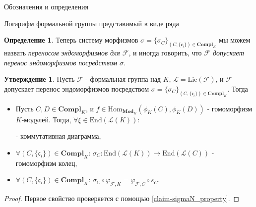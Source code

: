 \documentclass[a4paper,14pt]{extarticle}
\theoremstyle{definition}
\newtheorem{definition}{Определение}[section]
\newtheorem{claim}[theorem]{Утверждение}
\newcommand{\End}[1]{\mathrm{End}\left(#1\right)}
\newcommand{\Compl}[1]{\mathbf{Compl}_{#1}}
\newcommand{\forget}[1]{\phi_{#1}}
\newcommand{\Lie}[1]{\mathrm{Lie}\left(#1\right)}
\newcommand{\Mod}[1]{\mathbf{Mod}_{#1}}
\newcommand{\fc}{\mathfrak{c}}
\newcommand{\sF}{\mathscr{F}}
\newcommand{\sL}{\mathscr{L}}
\begin{document}
\begin{section}{Обозначения и определения}
\begin{subsection}{Логарифм формальной группы представимый в виде ряда}
\begin{definition}
    Теперь систему морфизмов ${ \sigma = \{ \sigma_C \}_{(C, \{ \fc_i \}) \in \Compl{K}} }$ мы можем назвать \textit{переносом эндоморфизмов для $\sF$}, и иногда говорить, что \textit{$\sF$ допускает перенос эндоморфизмов посредством $\sigma$}.
\end{definition}

\begin{claim}\label{claim-sigmaC_properties}
    Пусть $\sF$ - формальная группа над $K$, ${ \sL = \Lie{\sF} }$, и $\sF$ допускает перенос эндоморфизмов посредством ${ \sigma = \{ \sigma_C \}_{(C, \{ \fc_i \}) \in \Compl{K}} }$. Тогда
    \begin{itemize}
        \item Пусть ${ C, D \in \Compl{K} }$, и ${ f \in \mathrm{Hom}_{\Mod{K}}(\forget{K}(C), \forget{K}(D)) }$ - гомоморфизм $K$-модулей. Тогда, ${ \forall \xi \in \End{\sL(K)} }$:
        \begin{center}
        \end{center}
        - коммутативная диаграмма,
        \item ${ \forall (C, \{ \fc_i \}) \in \Compl{K} }$: ${ \sigma_C : \End{\sL(K)} \rightarrow \End{\sL(C)} }$ - гомоморфизм колец,
        \item ${ \forall (C, \{ \fc_i \}) \in \Compl{K} }$: ${ \sigma_C \circ \varphi_{\sF, K} = \varphi_{\sF, C} \circ s_C }$.
    \end{itemize}
\end{claim}
\begin{proof}
    Первое свойство проверяется с помощью \ref{claim-sigmaN_property}.


\end{proof}
\end{subsection}
\end{section}
\end{document}
